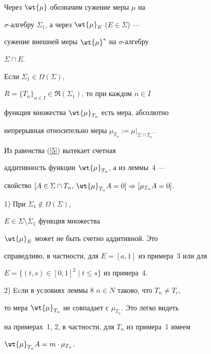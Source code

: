 Через $\wt{\mu}$ обозначим сужение меры $\mu$ на


$\sigma$-ал\-геб\-ру $\Sigma_1$, а через $\wt{\mu}_E$ ($E\in\Sigma$) ---


сужение внешней меры $\wt{\mu}^\ast$ на $\sigma$-ал\-геб\-ру


$\Sigma\cap E$.





\begin{lem} Если $\Sigma_1\in{\Omega}(\Sigma)$,


$R=\{T_n\}_{n\in I}\in\Re(\Sigma_1)$, то при каждом $n\in I$


функция множества $\wt{\mu}_{T_n}$ есть мера, абсолютно


непрерывная относительно меры $\mu_{T_n}:=\mu|_{\Sigma\cap T_n}$.


\end{lem}





\begin{pf} Из равенства (\ref{5}) вытекает счетная


аддитивность функции $\wt{\mu}_{T_n}$, а из леммы~4 ---


свойство $[A\in\Sigma\cap T_n,\,\wt{\mu}_{T_n}A=0]\Rightarrow


[{\mu}_{T_n}A=0]$.


\end{pf}





\begin{note} 1) При $\Sigma_1\notin{\Omega}(\Sigma)$,


$E\in\Sigma\setminus\Sigma_1$ функция множества


$\wt{\mu}_E$ может не быть счетно аддитивной. Это


справедливо, в частности, для $E=[a,1]$ из примера~3 или для


$E=\{(t,s)\in[0,1]^2\mid t\le s\}$ из примера~4.





2) Ecли в условиях леммы 8\; $n\in N$ таково, что $T_n\ne T_c$,


то мера $\wt{\mu}_{T_n}$ не совпадает с $\mu_{T_n}$. Это легко видеть


на примерах~1, 2, в частности, для $T_n$ из примера~1 имеем


$\wt{\mu}_{T_n}A=m\cdot\mu_{T_n}$.


\end{note}





